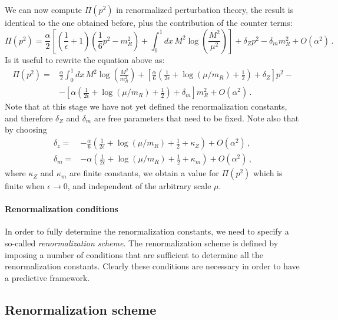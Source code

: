 We can now compute $\Pi(p^2)$ in renormalized perturbation theory, the
result is identical to the one obtained before, plus the contribution
of the counter terms:
\begin{equation}
  \label{eq:PiRenormPertTh}
  \Pi(p^2)=\frac{\alpha}{2}\left[
    \left(\frac{1}{\epsilon}+1\right)
    \left(\frac{1}{6}p^2-m_R^2\right) +
    \int_0^1dx\, M^2\log\left(\frac{M^2}{\mu^2}\right)
  \right] + \delta_Z p^2 - \delta_m m_R^2 + O(\alpha^2)\, .
\end{equation}
Is it useful to rewrite the equation above as:
\begin{align}
  \Pi(p^2)
  =& \frac{\alpha}{2}\int_0^1dx\,
     M^2\log\left(\frac{M^2}{m_R^2}\right) +
     \left[
     \frac{\alpha}{6} \left(\frac{1}{2\epsilon} + \log(\mu/m_R) +
     \frac12 \right) + \delta_Z
     \right] p^2 - \nonumber \\
   & - \left[
     \alpha\left(\frac{1}{2\epsilon} + \log(\mu/m_R) +
     \frac12 \right) + \delta_m
     \right] m_R^2 + O\left(\alpha^2\right)\, .
\end{align}
Note that at this stage we have not yet defined the renormalization
constants, and therefore $\delta_Z$ and $\delta_m$ are free parameters
that need to be fixed.  Note also that by choosing
\begin{align}
  \delta_z =& -\frac{\alpha}{6} \left(\frac{1}{2\epsilon} + \log(\mu/m_R) +
              \frac12 + \kappa_Z \right) + O\left(\alpha^2\right)\, , \\
  \delta_m =& -\alpha\left(\frac{1}{2\epsilon} + \log(\mu/m_R) +
     \frac12 + \kappa_m\right) + O\left(\alpha^2\right)\, , 
\end{align}
where $\kappa_Z$ and $\kappa_m$ are finite constants, we obtain a
value for $\Pi(p^2)$ which is finite when $\epsilon\to 0$, and
independent of the arbitrary scale $\mu$.

\paragraph{Renormalization conditions}

In order to fully determine the renormalization constants, we need to
specify a so-called {\em renormalization scheme}. The renormalization
scheme is defined by imposing a number of conditions that are
sufficient to determine all the renormalization constants. Clearly these
conditions are necessary in order to have a predictive framework.

\subsection{Renormalization scheme}
\label{sec:renorm-scheme}

